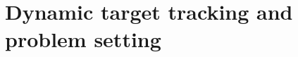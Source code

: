 \documentclass[conference]{IEEEtran}
\begin{document}


\section{Dynamic target tracking and problem setting} 
 \label{sec:problemSetup}
\end{document}
